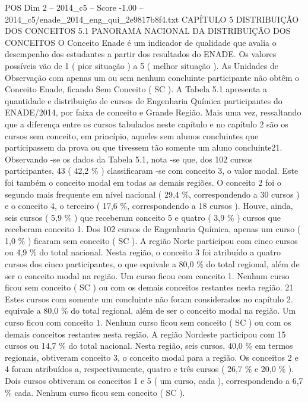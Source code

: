\begin{textsample}{POS Dim 2 – 2014\_c5 – Score -1.00 – 2014\_c5/enade\_2014\_eng\_qui\_2e9817b8f4.txt}  \label{ex:f2_pos_314}
CAPÍTULO 5 DISTRIBUIÇÃO DOS CONCEITOS 5.1 PANORAMA NACIONAL DA DISTRIBUIÇÃO DOS CONCEITOS O Conceito Enade é um indicador de qualidade que avalia o desempenho dos estudantes a partir dos resultados do ENADE.
Os valores possíveis vão de 1 ( pior situação ) a 5 ( melhor situação ).
As Unidades de Observação com apenas um ou sem nenhum concluinte participante não obtêm o Conceito Enade, ficando Sem Conceito ( SC ).
A Tabela 5.1 apresenta a quantidade e distribuição de cursos de Engenharia Química participantes do ENADE/2014, por faixa de conceito e Grande Região.
Mais uma vez, ressaltando que a diferença entre os cursos tabulados neste capítulo e no capítulo 2 são os cursos sem conceito, em princípio, aqueles sem alunos concluintes que participassem da prova ou que tivessem tão somente um aluno concluinte21.
Observando -se os dados da Tabela 5.1, nota -se que, dos 102 cursos participantes, 43 ( 42,2 \% ) classificaram -se com conceito 3, o valor modal.
Este foi também o conceito modal em todas as demais regiões.
O conceito 2 foi o segundo mais frequente em nível nacional ( 29,4 \%, correspondendo a 30 cursos ) e o conceito 4, o terceiro ( 17,6 \%, correspondendo a 18 cursos ).
Houve, ainda, seis cursos ( 5,9 \% ) que receberam conceito 5 e quatro ( 3,9 \% ) cursos que receberam conceito 1.
Dos 102 cursos de Engenharia Química, apenas um curso ( 1,0 \% ) ficaram sem conceito ( SC ).
A região Norte participou com cinco cursos ou 4,9 \% do total nacional.
Nesta região, o conceito 3 foi atribuído a quatro cursos dos cinco participantes, o que equivale a 80,0 \% do total regional, além de ser o conceito modal na região.
Um curso ficou com conceito 1.
Nenhum curso ficou sem conceito ( SC ) ou com os demais conceitos restantes nesta região. 21 Estes cursos com somente um concluinte não foram considerados no capítulo 2. equivale a 80,0 \% do total regional, além de ser o conceito modal na região.
Um curso ficou com conceito 1.
Nenhum curso ficou sem conceito ( SC ) ou com os demais conceitos restantes nesta região.
A região Nordeste participou com 15 cursos ou 14,7 \% do total nacional.
Nesta região, seis cursos, 40,0 \% em termos regionais, obtiveram conceito 3, o conceito modal para a região.
Os conceitos 2 e 4 foram atribuídos a, respectivamente, quatro e três cursos ( 26,7 \% e 20,0 \% ).
Dois cursos obtiveram os conceitos 1 e 5 ( um curso, cada ), correspondendo a 6,7 \% cada.
Nenhum curso ficou sem conceito ( SC ).

\end{textsample}
